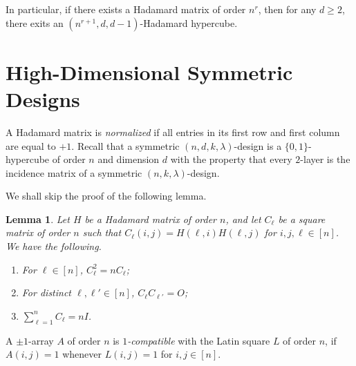 \documentclass[11pt,oneside]{amsart}
\newtheorem{lemma}[theorem]{Lemma}
\begin{document}
{In particular, if there exists a Hadamard matrix of order $n^r$, then for any $d\geq 2$, there exits an $(n^{r+1},d,d-1)$-Hadamard hypercube. 


\section{High-Dimensional Symmetric Designs}\label{subsec:hcube1}

A Hadamard matrix is  \textit{normalized} if all entries in its first row and first column are equal to $+1$. 
Recall that a symmetric $(n,d, k,\lambda)$-design is a  $\{0,1\}$-hypercube of order $n$ and dimension $d$ with the property that every 
 $2$-layer is the incidence matrix of a symmetric $(n,k,\lambda)$-design. 


We shall skip the proof of the following lemma. 
\begin{lemma}\label{lem:cmat}
Let $H$ be a Hadamard matrix of order $n$, and let $C_\ell$ be a square matrix of order $n$ such that $C_\ell (i,j) =H(\ell,i)H(\ell,j)$ for $i,j,\ell\in [n]$. We have the following.
    \begin{enumerate}
        \item [\textup{(i)}]  For $\ell\in [n]$, $C_\ell^2=n C_\ell$; 
        \item [\textup{(ii)}] \label{item:2} For distinct $\ell,\ell'\in [n]$, $C_\ell C_{\ell'}=O$;
        \item [\textup{(iii)}]  $\sum_{\ell=1}^n C_\ell=nI$. 
    \end{enumerate}
\end{lemma}



A $\pm 1$-array $A$ of order $n$ is {\it $1$-compatible} with the Latin square $L$ of order $n$, if $A(i,j)=1$ whenever $L(i,j)=1$ for $i,j\in [n]$. 

}
\end{document}
